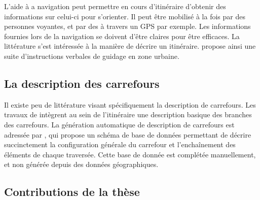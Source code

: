 \newpar{}



L'aide à a navigation peut permettre en cours d'itinéraire d'obtenir des informations sur celui-ci pour s'orienter. Il peut être mobilisé à la fois par des personnes voyantes, et par des \pcdvs{} à travers un GPS par exemple. Les informations fournies lors de la navigation se doivent d'être claires pour être efficaces. La littérature s'est intéressée à la manière de décrire un itinéraire.  propose ainsi une suite d’instructions verbales de guidage en zone urbaine.


\todo{}

\subsection{La description des carrefours}


Il existe peu de littérature visant spécifiquement la description de carrefours. Les travaux de  intègrent au sein de l'itinéraire une description basique des branches des carrefours. La génération automatique de description de carrefours est adressée par , qui propose un schéma de base de données permettant de décrire succinctement la configuration générale du carrefour et l'enchaînement des éléments de chaque traversée. Cette base de donnée est complétée manuellement, et non générée depuis des données géographiques.

\todo{}

\subsection{Contributions de la thèse}


\todo{}
